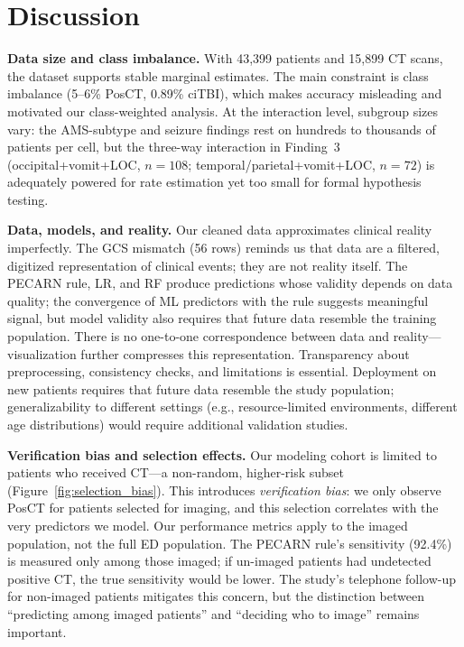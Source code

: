 \documentclass[11pt,letterpaper]{article}
\begin{document}
\section{Discussion}\label{discussion}

\textbf{Data size and class imbalance.} With 43,399 patients and 15,899 CT scans, the dataset supports stable marginal estimates. The main constraint is class imbalance (5--6\% PosCT, 0.89\% ciTBI), which makes accuracy misleading and motivated our class-weighted analysis. At the interaction level, subgroup sizes vary: the AMS-subtype and seizure findings rest on hundreds to thousands of patients per cell, but the three-way interaction in Finding~3 (occipital+vomit+LOC, $n=108$; temporal/parietal+vomit+LOC, $n=72$) is adequately powered for rate estimation yet too small for formal hypothesis testing.

\textbf{Data, models, and reality.} Our cleaned data approximates clinical reality imperfectly. The GCS mismatch (56 rows) reminds us that data are a filtered, digitized representation of clinical events; they are not reality itself. The PECARN rule, LR, and RF produce predictions whose validity depends on data quality; the convergence of ML predictors with the rule suggests meaningful signal, but model validity also requires that future data resemble the training population. There is no one-to-one correspondence between data and reality---visualization further compresses this representation. Transparency about preprocessing, consistency checks, and limitations is essential. Deployment on new patients requires that future data resemble the study population; generalizability to different settings (e.g., resource-limited environments, different age distributions) would require additional validation studies.

\textbf{Verification bias and selection effects.} Our modeling cohort is limited to patients who received CT---a non-random, higher-risk subset (Figure~\ref{fig:selection_bias}). This introduces \emph{verification bias}: we only observe PosCT for patients selected for imaging, and this selection correlates with the very predictors we model. Our performance metrics apply to the imaged population, not the full ED population. The PECARN rule's sensitivity (92.4\%) is measured only among those imaged; if un-imaged patients had undetected positive CT, the true sensitivity would be lower. The study's telephone follow-up for non-imaged patients mitigates this concern, but the distinction between ``predicting among imaged patients'' and ``deciding who to image'' remains important.
\end{document}
